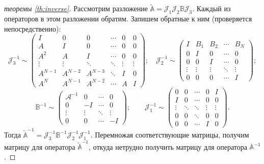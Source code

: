 \begin{proof}[ теоремы \ref{th:inverse}]
    Рассмотрим разложение $\widetilde{\mathbb A} = \mathcal J_1 \mathcal J_2 \mathbb B \mathcal J_3$. Каждый из операторов в этом разложении обратим. Запишем обратные к ним (проверяется непосредственно):
    \[\mathcal J_3^{-1} \sim \begin{pmatrix}
    I & 0 & 0 & \cdots & 0 & 0 \\
    A & I & 0 & \cdots & 0 & 0 \\
    A^2 & A & I & \cdots & 0 & 0 \\
    \vdots & \vdots & \ddots & \ddots & \vdots & \vdots \\
    A^{N-1} & A^{N-2} & A^{N-3} & \ddots & I & 0 \\
    A^N & A^{N-1} & A^{N-2} & \cdots & A & I
   \end{pmatrix}; \quad
   \mathcal J_2^{-1} \sim \begin{pmatrix}
    I & B_1 & B_2 & \cdots & B_N \\
    0 & I & 0 & \cdots &  0 \\
    0 & 0 & I & \cdots &  0 \\
    \vdots & \vdots & \vdots &  \ddots & \vdots \\
    0 & 0 & 0 & \cdots & I
   \end{pmatrix};
   \]
   \[\mathbb B^{-1} \sim \begin{pmatrix}
     \mathcal A^{-1} & 0 & \cdots &  0 \\
    0 & -I  & \cdots &  0 \\
    \vdots & \vdots & \ddots &  \vdots \\
    0 & 0 & \cdots &  -I
   \end{pmatrix}; \quad\quad \mathcal J_1^{-1} \sim \begin{pmatrix}
    0 & 0 & \cdots & 0 &  I \\
    I & 0 & \cdots & 0 &  0 \\[-0.3em]
    \vdots & \ddots & \ddots &  \vdots & \vdots\\[-0.5em]
    0 & 0 & \ddots & 0 & 0 \\
    0 & 0 & \cdots & I & 0
   \end{pmatrix}.\]
   Тогда $\widetilde{\mathbb A}^{-1} = \mathcal J_3^{-1}  \mathbb B^{-1} \mathcal J_2^{-1} \mathcal J_1^{-1}$. Перемножая соответствующие матрицы, получим матрицу для оператора $\widetilde{\mathbb A}^{-1}$, откуда нетрудно получить матрицу для оператора $\mathbb A^{-1}$.
\end{proof}
